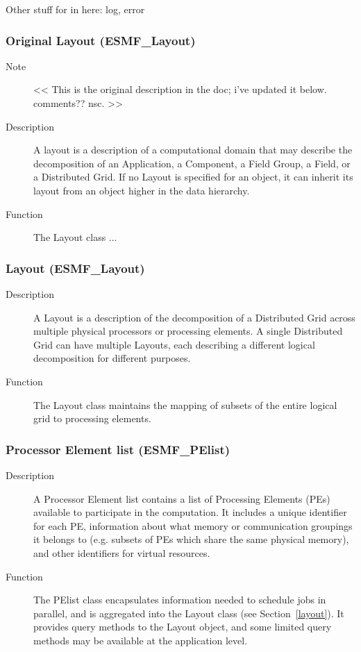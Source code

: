 Other stuff for in here: log, error

\subsubsection{Original Layout (ESMF\_Layout)}
\label{sec:olayout} 
\begin{description}
\item [Note] << This is the original description in the doc; i've updated
it below.  comments?? nsc. >>
\item [Description] A layout is a description of a computational domain that
may describe the decomposition of an Application, a Component, a Field Group, a Field, or 
a Distributed Grid.
If no Layout is specified for an object, it can inherit its layout from an object
higher in the data hierarchy.  
\item [Function] The Layout class ...
\end{description}

\subsubsection{Layout (ESMF\_Layout)}
\label{sec:layout} 
\begin{description}
\item [Description] A Layout is a description of the decomposition of
a Distributed Grid across multiple physical processors or processing elements.
A single Distributed Grid can have multiple Layouts, each describing a different
logical decomposition for different purposes.
\item [Function] The Layout class maintains the mapping of 
subsets of the entire logical grid to processing elements.
\end{description}

\subsubsection{Processor Element list (ESMF\_PElist)}
\label{sec:pelist} 
\begin{description}
\item [Description] A Processor Element list contains a list of Processing Elements (PEs) 
available to participate in the computation.  It includes a unique identifier for each PE, 
information about what memory or communication groupings it belongs to (e.g. subsets 
of PEs which share the same physical memory), and other identifiers for virtual resources.  
\item [Function] The PElist class encapsulates information needed to schedule
jobs in parallel, and is aggregated into the Layout class (see Section~\ref{layout}).
It provides query methods to the Layout object, and some limited query methods
may be available at the application level.
\end{description}

